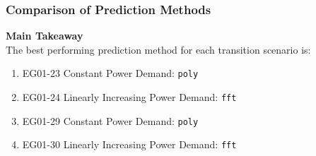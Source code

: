 \begin{frame}
  \frametitle{Comparison of Prediction Methods}
  \textbf{Main Takeaway}
  \\
  The best performing prediction method for each transition scenario is: 
  \begin{enumerate}
    \item EG01-23 Constant Power Demand: \texttt{poly}
    \item EG01-24 Linearly Increasing Power Demand: \texttt{fft}
    \item EG01-29 Constant Power Demand: \texttt{poly}
    \item EG01-30 Linearly Increasing Power Demand: \texttt{fft}
\end{enumerate}
\end{frame}
